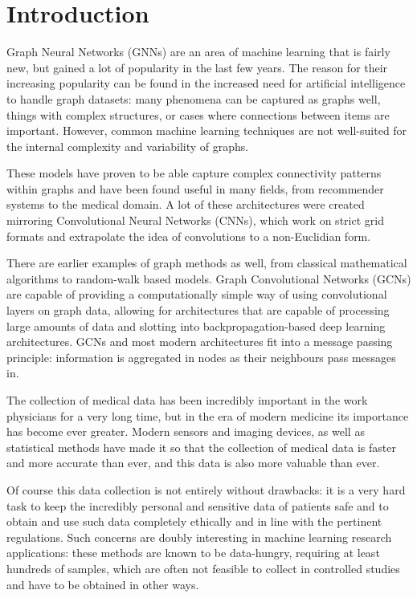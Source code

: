 \chapter{Introduction}

Graph Neural Networks (GNNs) are an area of machine learning that is fairly new, but gained a lot of popularity in the last few years. The reason for their increasing popularity can be found in the increased need for artificial intelligence to handle graph datasets: many phenomena can be captured as graphs well, things with complex structures, or cases where connections between items are important. However, common machine learning techniques are not well-suited for the internal complexity and variability of graphs. 

These models have proven to be able capture complex connectivity patterns within graphs and have been found useful in many fields, from recommender systems to the medical domain. A lot of these architectures were created mirroring Convolutional Neural Networks (CNNs), which work on strict grid formats and extrapolate the idea of convolutions to a non-Euclidian form. 

There are earlier examples of graph methods as well, from classical mathematical algorithms to random-walk based models. Graph Convolutional Networks (GCNs) are capable of providing a computationally simple way of using convolutional layers on graph data, allowing for architectures that are capable of processing large amounts of data and slotting into backpropagation-based deep learning architectures. GCNs and most modern architectures fit into a message passing principle: information is aggregated in nodes as their neighbours pass messages in.

The collection of medical data has been incredibly important in the work physicians for a very long time, but in the era of modern medicine its importance has become ever greater. Modern sensors and imaging devices, as well as statistical methods have made it so that the collection of medical data is faster and more accurate than ever, and this data is also more valuable than ever. 

Of course this data collection is not entirely without drawbacks: it is a very hard task to keep the incredibly personal and sensitive data of patients safe and to obtain and use such data completely ethically and in line with the pertinent regulations. Such concerns are doubly interesting in machine learning research applications: these methods are known to be data-hungry, requiring at least hundreds of samples, which are often not feasible to collect in controlled studies and have to be obtained in other ways.

